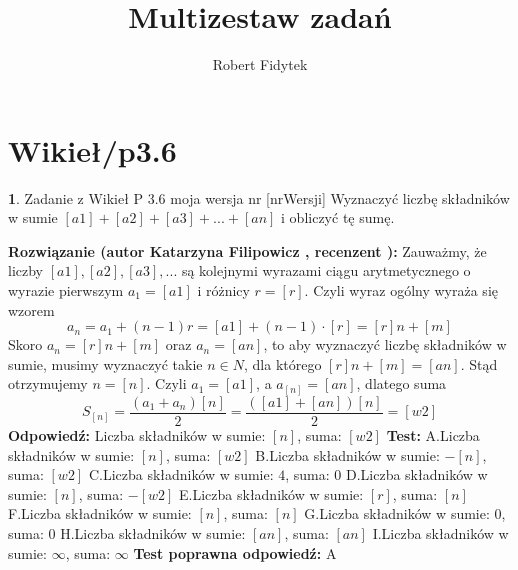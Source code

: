 \documentclass[12pt, a4paper]{article}
\title{Multizestaw zadań}
\author{Robert Fidytek}
\date{}
\theoremstyle{definition} %
\newtheorem{zad}{}
\newcommand{\kategoria}[1]{\section{#1}} %
\newcommand{\zadStart}[1]{\begin{zad}#1\newline} %
\newcommand{\zadStop}{\end{zad}}   %
\newcommand{\rozwStart}[2]{\noindent \textbf{Rozwiązanie (autor #1 , recenzent #2): }\newline} %
\newcommand{\rozwStop}{\newline}                                            %
\newcommand{\odpStart}{\noindent \textbf{Odpowiedź:}\newline}    %
\newcommand{\odpStop}{\newline}                                             %
\newcommand{\testStart}{\noindent \textbf{Test:}\newline} %
\newcommand{\testStop}{\newline} %
\newcommand{\kluczStart}{\noindent \textbf{Test poprawna odpowiedź:}\newline} %
\newcommand{\kluczStop}{\newline} %
\begin{document}
\maketitle


\kategoria{Wikieł/p3.6}
\zadStart{Zadanie z Wikieł P 3.6 moja wersja nr [nrWersji]}
Wyznaczyć liczbę składników w sumie $[a1]+[a2]+[a3]+...+[an]$ i obliczyć tę sumę.
\zadStop
\rozwStart{Katarzyna Filipowicz}{}
Zauważmy, że liczby $[a1],[a2],[a3],...$ są kolejnymi wyrazami ciągu arytmetycznego o wyrazie pierwszym $a_1=[a1]$ i różnicy $r=[r]$. Czyli wyraz ogólny wyraża się wzorem
$$
a_n=a_1+(n-1)r=[a1]+(n-1)\cdot [r]=[r] n+[m]
$$
Skoro $a_n=[r]n+[m]$ oraz $a_n=[an]$, to aby wyznaczyć liczbę składników w sumie, musimy wyznaczyć takie $n \in N$, dla którego $[r] n+[m]=[an]$. Stąd otrzymujemy $n=[n]$. Czyli $a_1=[a1]$, a $a_{[n]}=[an]$, dlatego suma
$$
S_{[n]}=\frac{(a_1+a_n)[n]}{2}=\frac{([a1]+[an])[n]}{2}=[w2]
$$
\rozwStop
\odpStart
Liczba składników w sumie: $[n]$, suma: $[w2]$
\odpStop
\testStart
A.Liczba składników w sumie: $[n]$, suma: $[w2]$
B.Liczba składników w sumie: $-[n]$, suma: $[w2]$
C.Liczba składników w sumie: $4$, suma: $0$
D.Liczba składników w sumie: $[n]$, suma: $-[w2]$
E.Liczba składników w sumie: $[r]$, suma: $[n]$
F.Liczba składników w sumie: $[n]$, suma: $[n]$
G.Liczba składników w sumie: $0$, suma: $0$
H.Liczba składników w sumie: $[an]$, suma: $[an]$
I.Liczba składników w sumie: $\infty$, suma: $\infty$
\testStop
\kluczStart
A
\kluczStop
\end{document}
